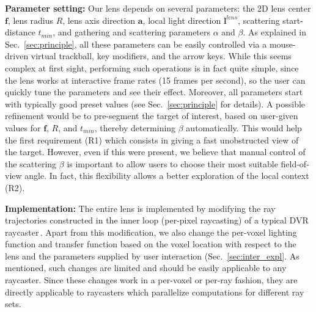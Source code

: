 \vspace{0.15cm}
\noindent\textbf{Parameter setting:} Our lens depends on several parameters: the 2D lens center $\mathbf{f}$, lens radius $R$, lens axis direction $\mathbf{a}$, local light direction $\mathbf{l}^{lens}$, scattering start-distance $t_{min}$, and gathering and scattering parameters $\alpha$ and $\beta$. As explained in Sec.~\ref{sec:principle}, all these parameters can be easily controlled via a mouse-driven virtual trackball, key modifiers, and the arrow keys. While this seems complex at first sight, performing such operations is in fact quite simple, since the lens works at interactive frame rates (15 frames per second), so the user can quickly tune the parameters and see their effect. Moreover, all parameters start with typically good preset values (see Sec.~\ref{sec:principle} for details). A possible refinement would be to pre-segment the target of interest, based on user-given values for $\mathbf{f}$, $R$, and $t_{min}$, thereby determining $\beta$ automatically. This would help the first requirement (R1) which consists in giving a fast unobstructed view of the target. However, even if this were present, we believe that manual control of the scattering $\beta$ is important to allow users to choose their most suitable field-of-view angle. In fact, this flexibility allows a better exploration of the local context (R2).

\vspace{0.15cm}
\noindent\textbf{Implementation:} The entire lens is implemented by modifying the ray trajectories constructed in the inner loop (per-pixel raycasting) of a typical DVR raycaster\,\cite{cudasdk}. Apart from this modification, we also change the per-voxel lighting function and transfer function based on the voxel location with respect to the lens and the parameters supplied by user interaction (Sec.~\ref{sec:inter_expl}. As mentioned, such changes are limited and should be easily applicable to any raycaster. Since these changes work in a per-voxel or per-ray fashion, they are directly applicable to raycasters which parallelize computations for different ray sets. 

